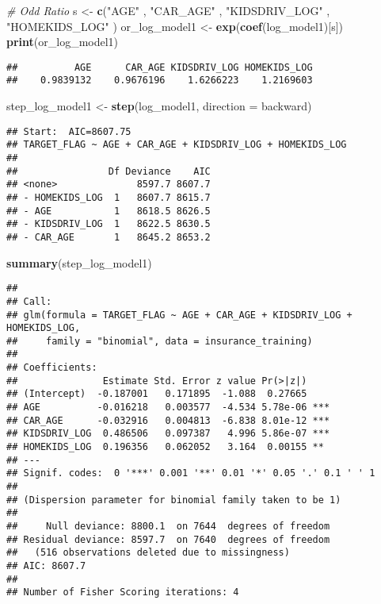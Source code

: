 \documentclass[
]{article}
\newenvironment{Shaded}{\begin{snugshade}}{\end{snugshade}}
\newcommand{\AttributeTok}[1]{\textcolor[rgb]{0.13,0.29,0.53}{#1}}
\newcommand{\CommentTok}[1]{\textcolor[rgb]{0.56,0.35,0.01}{\textit{#1}}}
\newcommand{\FunctionTok}[1]{\textcolor[rgb]{0.13,0.29,0.53}{\textbf{#1}}}
\newcommand{\NormalTok}[1]{#1}
\newcommand{\OtherTok}[1]{\textcolor[rgb]{0.56,0.35,0.01}{#1}}
\newcommand{\StringTok}[1]{\textcolor[rgb]{0.31,0.60,0.02}{#1}}
\begin{document}
\begin{Shaded}
\begin{Highlighting}[]
\CommentTok{\# Odd Ratio }
\NormalTok{s }\OtherTok{\textless{}{-}} \FunctionTok{c}\NormalTok{(}\StringTok{"AGE"}\NormalTok{ , }\StringTok{"CAR\_AGE"}\NormalTok{ , }\StringTok{"KIDSDRIV\_LOG"}\NormalTok{ , }\StringTok{"HOMEKIDS\_LOG"}\NormalTok{ )}
\NormalTok{or\_log\_model1 }\OtherTok{\textless{}{-}} \FunctionTok{exp}\NormalTok{(}\FunctionTok{coef}\NormalTok{(log\_model1)[s])}
\FunctionTok{print}\NormalTok{(or\_log\_model1)}
\end{Highlighting}
\end{Shaded}

\begin{verbatim}
##          AGE      CAR_AGE KIDSDRIV_LOG HOMEKIDS_LOG 
##    0.9839132    0.9676196    1.6266223    1.2169603
\end{verbatim}

\begin{Shaded}
\begin{Highlighting}[]
\NormalTok{step\_log\_model1 }\OtherTok{\textless{}{-}} \FunctionTok{step}\NormalTok{(log\_model1, }\AttributeTok{direction =} \StringTok{\textquotesingle{}backward\textquotesingle{}}\NormalTok{)}
\end{Highlighting}
\end{Shaded}

\begin{verbatim}
## Start:  AIC=8607.75
## TARGET_FLAG ~ AGE + CAR_AGE + KIDSDRIV_LOG + HOMEKIDS_LOG
## 
##                Df Deviance    AIC
## <none>              8597.7 8607.7
## - HOMEKIDS_LOG  1   8607.7 8615.7
## - AGE           1   8618.5 8626.5
## - KIDSDRIV_LOG  1   8622.5 8630.5
## - CAR_AGE       1   8645.2 8653.2
\end{verbatim}

\begin{Shaded}
\begin{Highlighting}[]
\FunctionTok{summary}\NormalTok{(step\_log\_model1)}
\end{Highlighting}
\end{Shaded}

\begin{verbatim}
## 
## Call:
## glm(formula = TARGET_FLAG ~ AGE + CAR_AGE + KIDSDRIV_LOG + HOMEKIDS_LOG, 
##     family = "binomial", data = insurance_training)
## 
## Coefficients:
##               Estimate Std. Error z value Pr(>|z|)    
## (Intercept)  -0.187001   0.171895  -1.088  0.27665    
## AGE          -0.016218   0.003577  -4.534 5.78e-06 ***
## CAR_AGE      -0.032916   0.004813  -6.838 8.01e-12 ***
## KIDSDRIV_LOG  0.486506   0.097387   4.996 5.86e-07 ***
## HOMEKIDS_LOG  0.196356   0.062052   3.164  0.00155 ** 
## ---
## Signif. codes:  0 '***' 0.001 '**' 0.01 '*' 0.05 '.' 0.1 ' ' 1
## 
## (Dispersion parameter for binomial family taken to be 1)
## 
##     Null deviance: 8800.1  on 7644  degrees of freedom
## Residual deviance: 8597.7  on 7640  degrees of freedom
##   (516 observations deleted due to missingness)
## AIC: 8607.7
## 
## Number of Fisher Scoring iterations: 4
\end{verbatim}
\end{document}
